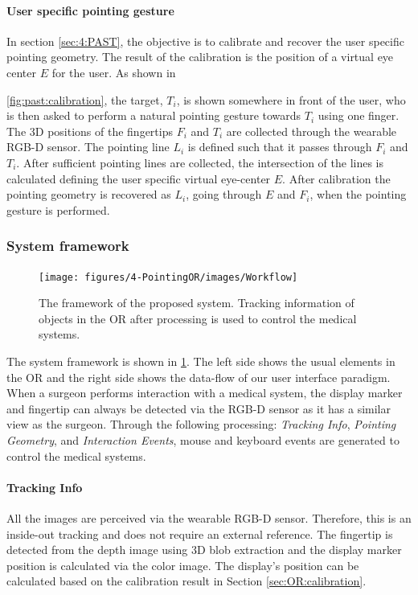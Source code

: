 \paragraph{User specific pointing gesture}
In section \ref{sec:4:PAST}, the objective is to calibrate and recover the user specific pointing geometry. The result of the calibration is the position of a virtual eye center $E$ for the user.
As shown in \figurename{ \ref{fig:past:calibration}, the target, $T_i$, is shown somewhere in front of the user, who is then asked to perform a natural pointing gesture towards $T_i$ using one finger. The 3D positions of the fingertips $F_i$ and $T_i$ are collected through the wearable RGB-D sensor. The pointing line $L_i$ is defined such that it passes through $F_i$ and $T_i$. After sufficient pointing lines are collected, the intersection of the lines is calculated defining the user specific virtual eye-center $E$. After calibration the pointing geometry is recovered as $L_{i}$, going through $E$ and  $F_i$, when the pointing gesture is performed.

\subsubsection{System framework}
\begin{figure}
	\centering
	\texttt{[image: figures/4-PointingOR/images/Workflow]}
	\caption{The framework of the proposed system. Tracking information of objects in the OR after processing is used to control the medical systems. }
	\label{fig:Workflow}       %
\end{figure}
The system framework is shown in \figurename{\ref{fig:Workflow}}.
The left side shows the usual elements in the OR and the right side shows the data-flow of our user interface paradigm. When a surgeon performs interaction with a medical system, the display marker and fingertip can always be detected via the RGB-D sensor as it has a similar view as the surgeon. 
Through the following processing: \textit{Tracking Info}, \textit{Pointing Geometry}, and \textit{Interaction Events}, mouse and keyboard events are generated to control the medical systems.

\paragraph{Tracking Info} 
All the images are perceived via the wearable RGB-D sensor. Therefore, this is an inside-out tracking and does not require an external reference. The fingertip is detected from the depth image using 3D blob extraction and the display marker position is calculated via the color image. The display's position can be calculated based on the calibration result in Section \ref{sec:OR:calibration}.

}
